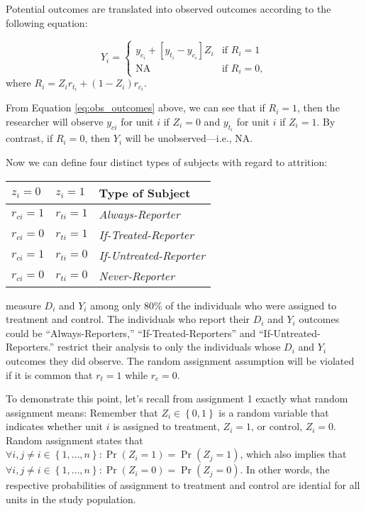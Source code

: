 \documentclass[11pt]{article}\usepackage[]{graphicx}\usepackage[]{color}
\theoremstyle{newstyle}
\begin{document}
Potential outcomes are translated into observed outcomes according to the following equation:

\begin{equation}
\label{eq:obs_outcomes}
Y_i = \begin{cases} y_{c_i} + [y_{t_i} - y_{c_i}] Z_i & \text{if } R_i = 1 \\
\text{NA} & \text{if } R_i = 0, \end{cases}
\end{equation}
where $R_i = Z_i r_{t_i} + \left(1 - Z_i\right) r_{c_i}$.

From Equation \ref{eq:obs_outcomes} above, we can see that if $R_i = 1$, then the researcher will observe $y_{ci}$ for unit $i$ if $Z_i = 0$ and $y_{t_i}$ for unit $i$ if $Z_i = 1$. By contrast, if $R_i = 0$, then $Y_i$ will be unobserved---i.e., NA.

Now we can define four distinct types of subjects with regard to attrition:

\begin{table}[h]
\centering
    \begin{tabular}{lll}
    \toprule
    $z_i = 0$ & $z_i = 1$ & Type of Subject       \\
    \midrule
    $r_{ci} = 1$ & $r_{ti} = 1$ & \textit{Always-Reporter} \\
    $r_{ci} = 0$ & $r_{ti} = 1$ & \textit{If-Treated-Reporter} \\
    $r_{ci} = 1$ & $r_{ti} = 0$ & \textit{If-Untreated-Reporter} \\
    $r_{ci} = 0$ & $r_{ti} = 0$ & \textit{Never-Reporter} \\
    \bottomrule
    \end{tabular}
\end{table}

\citet{albertsonlawrence2009} measure $D_i$ and $Y_i$ among only 80\% of the individuals who were assigned to treatment and control. The individuals who report their $D_i$ and $Y_i$ outcomes could be ``Always-Reporters,'' ``If-Treated-Reporters'' and ``If-Untreated-Reporters.'' \citet{albertsonlawrence2009} restrict their analysis to only the individuals whose $D_i$ and $Y_i$ outcomes they did observe. The random assignment assumption will be violated if it is common that $r_t = 1$ while $r_c = 0$.

To demonstrate this point, let's recall from assignment 1 exactly what random assignment means: Remember that $Z_i \in \left\{0, 1\right\}$ is a random variable that indicates whether unit $i$ is assigned to treatment, $Z_i = 1$, or control, $Z_i = 0$. Random assignment states that $\forall i, j \neq i \in \left\{1, \dots , n\right\}: \Pr\left(Z_i = 1\right) = \Pr\left(Z_j = 1\right)$, which also implies that $\forall i, j \neq i \in \left\{1, \dots , n\right\}: \Pr\left(Z_i = 0\right) = \Pr\left(Z_j = 0\right)$. In other words, the respective probabilities of assignment to treatment and control are idential for all units in the study population.
\end{document}
